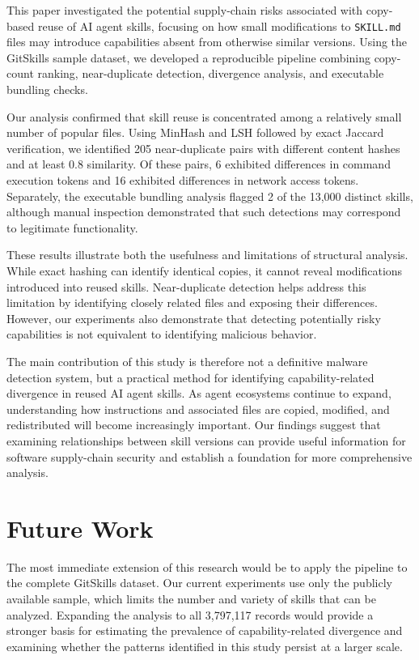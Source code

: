 \documentclass[sigconf,review]{acmart}
\begin{document}
This paper investigated the potential supply-chain risks associated with copy-based reuse of AI agent skills, focusing on how small modifications to \texttt{SKILL.md} files may introduce capabilities absent from otherwise similar versions. Using the GitSkills sample dataset, we developed a reproducible pipeline combining copy-count ranking, near-duplicate detection, divergence analysis, and executable bundling checks.

Our analysis confirmed that skill reuse is concentrated among a relatively small number of popular files. Using MinHash and LSH followed by exact Jaccard verification, we identified 205 near-duplicate pairs with different content hashes and at least 0.8 similarity. Of these pairs, 6 exhibited differences in command execution tokens and 16 exhibited differences in network access tokens. Separately, the executable bundling analysis flagged 2 of the 13,000 distinct skills, although manual inspection demonstrated that such detections may correspond to legitimate functionality.

These results illustrate both the usefulness and limitations of structural analysis. While exact hashing can identify identical copies, it cannot reveal modifications introduced into reused skills. Near-duplicate detection helps address this limitation by identifying closely related files and exposing their differences. However, our experiments also demonstrate that detecting potentially risky capabilities is not equivalent to identifying malicious behavior.

The main contribution of this study is therefore not a definitive malware detection system, but a practical method for identifying capability-related divergence in reused AI agent skills. As agent ecosystems continue to expand, understanding how instructions and associated files are copied, modified, and redistributed will become increasingly important. Our findings suggest that examining relationships between skill versions can provide useful information for software supply-chain security and establish a foundation for more comprehensive analysis.

\section{Future Work}
\label{Section:FutureWork}

The most immediate extension of this research would be to apply the pipeline to the complete GitSkills dataset. Our current experiments use only the publicly available sample, which limits the number and variety of skills that can be analyzed. Expanding the analysis to all 3,797,117 records would provide a stronger basis for estimating the prevalence of capability-related divergence and examining whether the patterns identified in this study persist at a larger scale.
\end{document}
